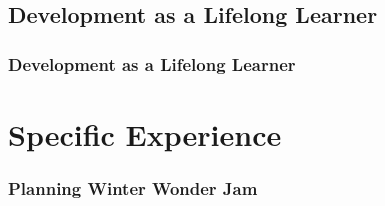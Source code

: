 \documentclass{beamer}
\begin{document}

\subsection{Development as a Lifelong Learner}

\begin{frame}
\frametitle{Development as a Lifelong Learner}

\end{frame}

\section{Specific Experience}

\begin{frame}
\frametitle{Planning Winter Wonder Jam}
\begin{figure}[htp]
	\centering
	\quad
\end{figure}
\end{frame}
\end{document}
